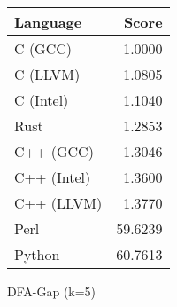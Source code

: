 \begin{subtable}{0.33\textwidth}
    \centering
    \begin{tabular}{|l|r|}
        \hline
        Language & Score \\
        \hline
        C (GCC) & 1.0000 \\
        C (LLVM) & 1.0805 \\
        C (Intel) & 1.1040 \\
        Rust & 1.2853 \\
        C++ (GCC) & 1.3046 \\
        C++ (Intel) & 1.3600 \\
        C++ (LLVM) & 1.3770 \\
        Perl & 59.6239 \\
        Python & 60.7613 \\
        \hline
    \end{tabular}
    \caption{DFA-Gap (k=5)}
    \label{table:runtime:dfa_gap(5)}
\end{subtable}
